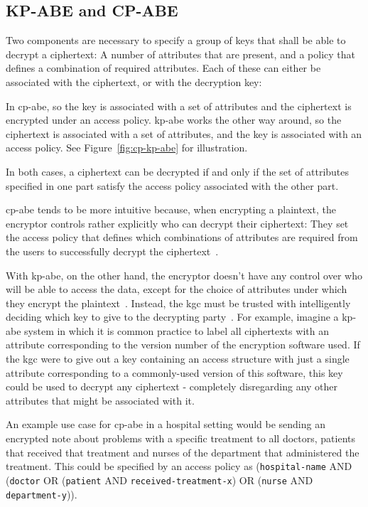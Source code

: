 \subsection{KP-ABE and CP-ABE}

Two components are necessary to specify a group of keys that shall be able to decrypt a ciphertext: A number of attributes that are present, and a policy that defines a combination of required attributes. 
Each of these can either be associated with the ciphertext, or with the decryption key:

In \acrfull{cp-abe}, so the key is associated with a set of attributes and the ciphertext is encrypted under an access policy.
\acrfull{kp-abe} works the other way around, so the ciphertext is associated with a set of attributes, and the key is associated with an access policy.
See Figure~\ref{fig:cp-kp-abe} for illustration.

In both cases, a ciphertext can be decrypted if and only if the set of attributes specified in one part satisfy the access policy associated with the other part.

\acrshort{cp-abe} tends to be more intuitive because, when encrypting a plaintext, the encryptor controls rather explicitly who can decrypt their ciphertext:
They set the access policy that defines which combinations of attributes are required from the users to successfully decrypt the ciphertext~\cite{bethencourt_ciphertext-policy_2007}.

With \acrshort{kp-abe}, on the other hand, the encryptor doesn't have any control over who will be able to access the data, except for the choice of attributes under which they encrypt the plaintext~\cite{bethencourt_ciphertext-policy_2007}.
Instead, the \acrlong{kgc} must be trusted with intelligently deciding which key to give to the decrypting party~\cite{bethencourt_ciphertext-policy_2007}.
For example, imagine a \acrshort{kp-abe} system in which it is common practice to label all ciphertexts with an attribute corresponding to the version number of the encryption software used.
If the \acrshort{kgc} were to give out a key containing an access structure with just a single attribute corresponding to a commonly-used version of this software, this key could be used to decrypt any ciphertext - completely disregarding any other attributes that might be associated with it.

An example use case for \acrshort{cp-abe} in a hospital setting would be sending an encrypted note about problems with a specific treatment to all doctors, patients that received that treatment and nurses of the department that administered the treatment.
This could be specified by an access policy as (\texttt{hospital-name} AND (\texttt{doctor} OR (\texttt{patient} AND \texttt{received-treatment-x}) OR (\texttt{nurse} AND \texttt{department-y})). %

